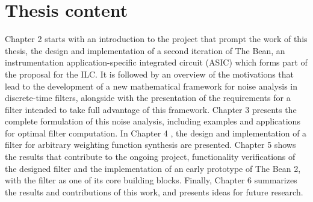 \section{Thesis content}
Chapter 2 starts with an introduction to the project that prompt the work of this thesis, the design and implementation of a second iteration of The Bean, an instrumentation application-specific integrated circuit (ASIC) which forms part of the proposal for the ILC. It is followed by an overview of the motivations that lead to the development of a new mathematical framework for noise analysis in discrete-time filters, alongside with the presentation of the requirements for a filter intended to take full advantage of this framework. Chapter 3 presents the complete formulation of this noise analysis, including examples and applications for optimal filter computation. In Chapter 4 , the design and implementation of a filter for arbitrary weighting function synthesis are presented. Chapter 5 shows the results that contribute to the ongoing project, functionality verifications of the designed filter and the implementation of an early prototype of The Bean 2, with the filter as one of its core building blocks. Finally, Chapter 6 summarizes the results and contributions of this work, and presents ideas for future research.